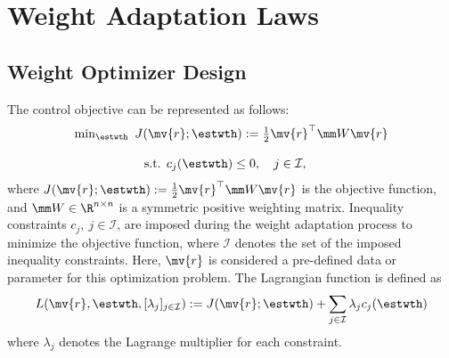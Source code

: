 \documentclass[lettersize,journal]{IEEEtran}
\newcommand*{\fe}{\mv{r}}
\begin{document}
\section{Weight Adaptation Laws}\label{sec:adap_laws}

\subsection{Weight Optimizer Design}\label{sec:sub:weight optimizer}

The control objective can be represented as follows:
\begin{equation}
    \begin{matrix}
        \min_{\estwth} \ J(\fe;\estwth):= 
        \tfrac{1}{2} \fe^\top  \mm W\fe
        \\ \\
        \begin{aligned}
        \text{s.t. }&c_{j}(\estwth) 
        \le0, \quad j\in\mathcal{I},
        \end{aligned}
    \end{matrix}
    \label{eq:opt:problem1}
\end{equation}
where $J(\fe;\estwth):= \tfrac{1}{2} \fe^\top  \mm W\fe$ is the objective function, and $\mm W\in\R^{n\times n}$ is a symmetric positive weighting matrix.
Inequality constraints $c_j,\ j\in\mathcal{I}$, are imposed during the weight adaptation process to minimize the objective function, where $\mathcal I$ denotes the set of the imposed inequality constraints. 
Here, $\fe$ is considered a pre-defined data or parameter for this optimization problem. The Lagrangian function is defined as
\begin{equation}
    L(
        \fe,\estwth,[\lambda_j]_{j\in\mathcal I}
    ) 
    := 
    J(\fe;\estwth) 
    + 
    \sum_{j\in\mathcal I}
    \lambda_{j}
    c_{j}(\estwth)
    \label{eq:lagrangian}
\end{equation}
where $\lambda_j$ denotes the Lagrange multiplier for each constraint.
\end{document}
